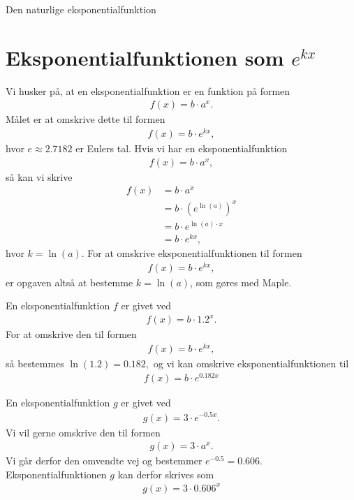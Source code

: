 \begin{center}
\Huge
	Den naturlige eksponentialfunktion
\end{center}
\section*{Eksponentialfunktionen som $e^{kx}$}

Vi husker på, at en eksponentialfunktion er en funktion på formen
\begin{align*}
	f(x) = b\cdot a^x.
\end{align*}
Målet er at omskrive dette til formen
\begin{align*}
	f(x) = b\cdot e^{kx},
\end{align*}
hvor $e \approx 2.7182$ er Eulers tal. Hvis vi har en eksponentialfunktion
\begin{align*}
	f(x) = b\cdot a^x,
\end{align*}
så kan vi skrive
\begin{align*}
	f(x) &= b \cdot a^x \\
	&= b \cdot \left(e^{\ln(a)}\right)^x\\
	&= b \cdot e^{\ln(a)\cdot x}\\
	&= b \cdot e^{kx},
\end{align*}
hvor $k = \ln(a)$. For at omskrive eksponentialfunktionen til formen 
\begin{align*}
	f(x) = b\cdot e^{kx},
\end{align*}
er opgaven altså at bestemme $k = \ln(a)$, som gøres med Maple. 

\begin{exa}
	En eksponentialfunktion $f$ er givet ved
	\begin{align*}
		f(x) = b \cdot 1.2^x.
	\end{align*}
	For at omskrive den til formen
	\begin{align*}
		f(x) = b\cdot e^{kx},
	\end{align*}			
	så bestemmes $\ln(1.2) = 0.182,$ og vi kan omskrive eksponentialfunktionen til
	\begin{align*}
		f(x) = b \cdot e^{0.182x}
	\end{align*}
\end{exa}

\begin{exa}
	En eksponentialfunktion $g$ er givet ved
	\begin{align*}
		g(x) = 3\cdot e^{-0.5x}.
	\end{align*}
	Vi vil gerne omskrive den til formen
	\begin{align*}
		g(x) = 3 \cdot a^x.
	\end{align*}
	Vi går derfor den omvendte vej og bestemmer $e^{-0.5} = 0.606$.
	Eksponentialfunktionen $g$ kan derfor skrives som
	\begin{align*}
		g(x) = 3 \cdot 0.606^x
	\end{align*}
\end{exa}

